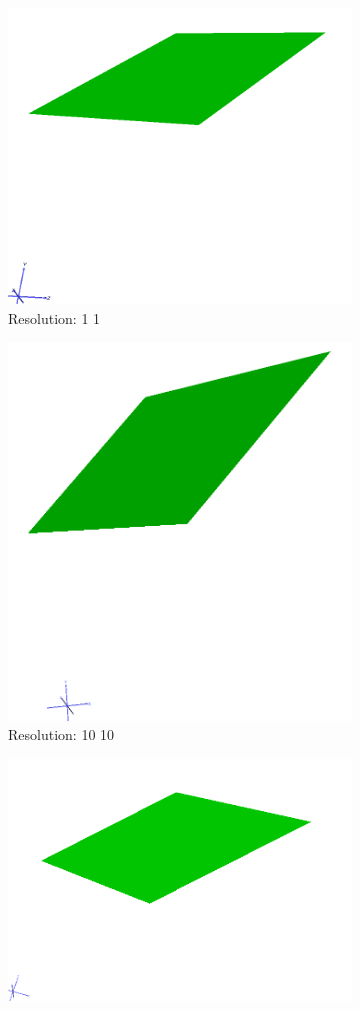 \documentclass[acmlarge,nonacm=true]{acmart}
\begin{document}
\begin{figure}[H]
	\begin{subfigure}{.33\textwidth}
	  \centering
	  \includegraphics[width=.8\linewidth]{fig/1a1_1}
	  \caption{Resolution: 1 1}
	\end{subfigure}%
	\begin{subfigure}{.33\textwidth}
	  \centering
	  \includegraphics[width=.8\linewidth]{fig/1a10_10}
	  \caption{Resolution: 10 10}
	\end{subfigure}
	\begin{subfigure}{.33\textwidth}
		\centering
		\includegraphics[width=.8\linewidth]{fig/1a1000_1000}

\end{subfigure}
\end{figure}
\end{document}
